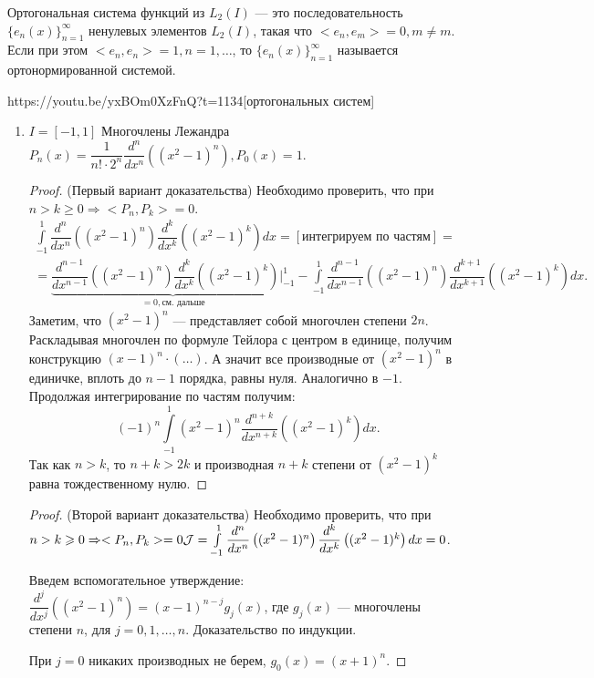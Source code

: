 \begin{Def}
	Ортогональная система функций из $L_2(I)$ --- это последовательность $\{e_n(x)\}_{n=1}^\infty$ ненулевых элементов $L_2(I)$, такая что $<e_n,e_m>=0, m\ne m$. Если при этом $<e_n,e_n>=1, n=1,\ldots$, то $\{e_n(x)\}_{n=1}^\infty$ называется ортонормированной системой.
\end{Def}

\begin{linkex}{https://youtu.be/yxBOm0XzFnQ?t=1134}[ортогональных систем]\ 
	\begin{enumerate}
		\item $I=[-1,1]$ Многочлены Лежандра $P_n(x)=\dfrac{1}{n!\cdot2^n}\dfrac{d^n}{dx^n}\left((x^2-1)^n\right), P_0(x)=1$.
		\begin{proof}(Первый вариант доказательства)
			Необходимо проверить, что при $n>k\geqslant 0 \Rightarrow <P_n, P_k>=0$. 
			\begin{multline*}
				\int\limits_{-1}^1\dfrac{d^n}{dx^n}\left((x^2-1)^n\right)\dfrac{d^k}{dx^k}\left((x^2-1)^k\right)dx=[\text{интегрируем по частям}]=\\=\underbrace{\dfrac{d^{n-1}}{dx^{n-1}}((x^2-1)^n)\dfrac{d^k}{dx^k}((x^2-1)^k)|_{-1}^1}_{=0, \text{см. дальше}}-\int\limits_{-1}^1\dfrac{d^{n-1}}{dx^{n-1}}((x^2-1)^n)\dfrac{d^{k+1}}{dx^{k+1}}((x^2-1)^k)dx.
			\end{multline*}
			Заметим, что $(x^2-1)^n$ --- представляет собой многочлен степени $2n$. Раскладывая многочлен по формуле Тейлора с центром в единице, получим конструкцию $(x-1)^n\cdot(\ldots)$. А значит все производные от $(x^2-1)^n$ в единичке, вплоть до $n-1$ порядка, равны нуля. Аналогично в $-1$. Продолжая интегрирование по частям получим: $$(-1)^n\int\limits_{-1}^1(x^2-1)^n\dfrac{d^{n+k}}{dx^{n+k}}((x^2-1)^k)dx.$$
			Так как $n>k$, то $n+k>2k$ и производная $n+k$ степени от $(x^2-1)^k$ равна тождественному нулю.
		\end{proof}
		\begin{proof}(Второй вариант доказательства)
			Необходимо проверить, что при $n>k\geqslant 0 \Rightarrow <P_n, P_k>=0 \\
			\mathcal{J}=\int\limits_{-1}^1\dfrac{d^n}{dx^n}\left((x^2-1)^n\right)\dfrac{d^k}{dx^k}\left((x^2-1)^k\right)dx=0$.
			
			Введем вспомогательное утверждение: $\dfrac{d^j}{dx^j}((x^2-1)^n)=(x-1)^{n-j}g_j(x)$, где $g_j(x)$ --- многочлены степени $n$, для $j=0,1,\ldots, n$. Доказательство по индукции. 
			
			При $j=0$ никаких производных не берем, $g_0(x)=(x+1)^n$. 
			

\end{proof}
\end{enumerate}
\end{linkex}
